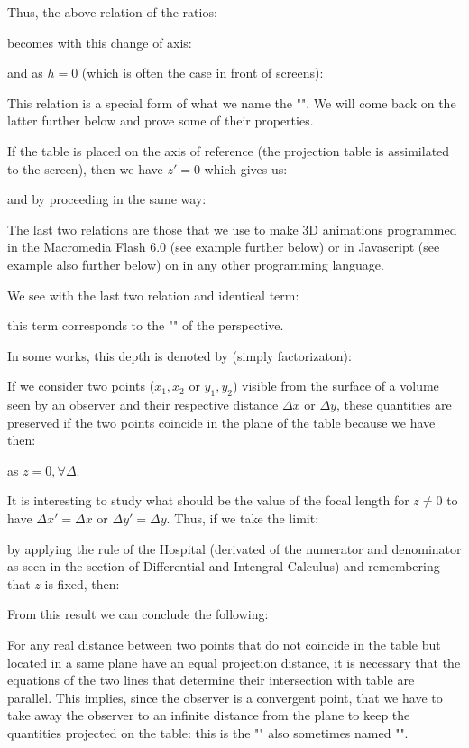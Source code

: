 	Thus, the above relation of the ratios:
	
	becomes with this change of axis:
	
	and as $h = 0$ (which is often the case in front of screens):
	
	\begin{tcolorbox}[title=Remark,colframe=black,arc=10pt]
	This relation is a special form of what we name the "". We will come back on the latter further below and prove some of their properties.
	\end{tcolorbox}
	If the table is placed on the axis of reference (the projection table is assimilated to the screen), then we have $z '= 0$ which gives us:
	
	and by proceeding in the same way:
	
	\begin{tcolorbox}[title=Remark,colframe=black,arc=10pt]
	The last two relations are those that we use to make 3D animations programmed in the Macromedia Flash 6.0 (see example further below) or in Javascript (see example also further below) on in any other programming language.
	\end{tcolorbox}
	
	
	We see with the last two relation and identical term:
	
	this term corresponds to the "" of the perspective.

	In some works, this depth is denoted by (simply factorizaton):
	
	If we consider two points ($x_1,x_2$ or $y_1,y_2$) visible from the surface of a volume seen by an observer and their respective distance $\Delta x$ or $\Delta y$, these quantities are preserved if the two points coincide in the plane of the table because we have then:
	
	as $z=0,\forall \Delta$.

	It is interesting to study what should be the value of the focal length for $z\neq 0$ to have $\Delta x'=\Delta x$ or $\Delta y'=\Delta y$. Thus, if we take the limit:
	
	by applying the rule of the Hospital (derivated of the numerator and denominator as seen in the section of Differential and Intengral Calculus) and remembering that $z$ is fixed, then:
	
	From this result we can conclude the following:
	
	For any real distance between two points that do not coincide in the table but located in a same plane have an equal projection distance, it is necessary that the equations of the two lines that determine their intersection with table are parallel. This implies, since the observer is a convergent point, that we have to take away the observer to an infinite distance from the plane to keep the quantities projected on the table: this is the "" also sometimes named "".
	
